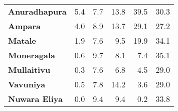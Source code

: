 \begin{tabular}{lrrrrr}
\textbf{Anuradhapura} &         5.4 &         7.7 &         13.8 &             39.5 &        30.3 \\
\textbf{Ampara      } &         4.0 &         8.9 &         13.7 &             29.1 &        27.2 \\
\textbf{Matale      } &         1.9 &         7.6 &          9.5 &             19.9 &        34.1 \\
\textbf{Moneragala  } &         0.6 &         9.7 &          8.1 &              7.4 &        35.1 \\
\textbf{Mullaitivu  } &         0.3 &         7.6 &          6.8 &              4.5 &        29.0 \\
\textbf{Vavuniya    } &         0.5 &         7.8 &         14.2 &              3.6 &        29.0 \\
\textbf{Nuwara Eliya} &         0.0 &         9.4 &          9.4 &              0.2 &        33.8 \\
\bottomrule
\end{tabular}

